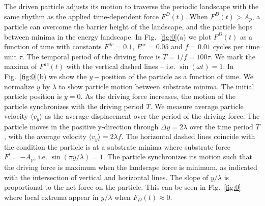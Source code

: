 \documentclass[twocolumn,preprintnumbers,amsmath,amssymb,aps,prx]{revtex4}
\begin{document}
The driven particle adjusts
its motion to traverse
the periodic landscape with the same rhythm as 
the applied time-dependent force $F^D(t)$.
When $F^D(t) > A_p$, a particle can 
overcome the barrier height of the landscape,
and 
the particle hops between minima in the energy landscape.
%
In Fig.~\ref{fig:0}(a)
we plot $F^D(t)$ %
as a function of time with
constants $F^{dc}=0.1$, 
$F^{ac}=0.05$ and $f=0.01$ cycles per time unit $\tau$.
The temporal period of the driving force is
$T = 1/f = 100 \tau$.
We mark the maxima of $F^{ac}(t)$
with the
vertical dashed lines %
-- i.e. $\sin{(\omega t)} = 1$.
%
%
%
In Fig.~\ref{fig:0}(b) 
we show the $y-$position of the particle
as a function of time.
We 
normalize $y$ by $\lambda$ %
to show  particle motion between substrate minima.  
The initial particle position is $y = 0 $. %
As the driving force increases,
the motion of the particle
synchronizes with the driving period $T$.
We measure 
average particle velocity $\langle{v}_y\rangle$
as the average displacement %
over the period of the driving force.
The particle moves
in the positive y-direction
through $\Delta y = 2 \lambda$ over the time period $T$,
with 
the average velocity 
$\langle {v}_y \rangle= 2 \lambda f$. %
The horizontal dashed lines
coincide with the condition the particle is at a substrate minima
where substrate force  $F^l = -A_p$,  
i.e. $\sin{(\pi y / \lambda)} = 1$.
The particle synchronizes its motion such that the 
driving force is maximum when the landscape 
force is minimum,
as indicated %
with the intersection of
vertical and horizontal lines.  
The slope of $y/\lambda$
is proportional to the net force on the particle.
This can be seen in 
Fig.~\ref{fig:0} %
where local extrema appear in $y/\lambda$
when $F_{D}(t) \approx 0 $. 
\end{document}
